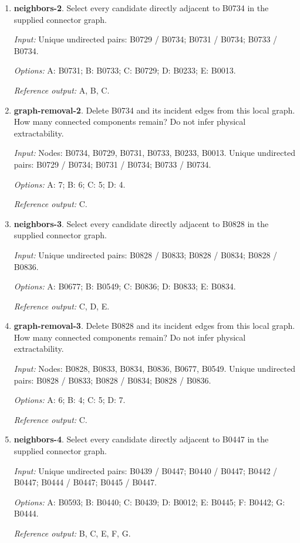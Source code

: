 \begin{enumerate}
\item \textbf{neighbors-2}. Select every candidate directly adjacent to B0734 in the supplied connector graph.\par {\small \textit{Input:} Unique undirected pairs: B0729 / B0734; B0731 / B0734; B0733 / B0734. \par\textit{Options:} A: B0731; B: B0733; C: B0729; D: B0233; E: B0013. \par\textit{Reference output:} A, B, C.}
\item \textbf{graph-removal-2}. Delete B0734 and its incident edges from this local graph. How many connected components remain? Do not infer physical extractability.\par {\small \textit{Input:} Nodes: B0734, B0729, B0731, B0733, B0233, B0013. Unique undirected pairs: B0729 / B0734; B0731 / B0734; B0733 / B0734. \par\textit{Options:} A: 7; B: 6; C: 5; D: 4. \par\textit{Reference output:} C.}
\item \textbf{neighbors-3}. Select every candidate directly adjacent to B0828 in the supplied connector graph.\par {\small \textit{Input:} Unique undirected pairs: B0828 / B0833; B0828 / B0834; B0828 / B0836. \par\textit{Options:} A: B0677; B: B0549; C: B0836; D: B0833; E: B0834. \par\textit{Reference output:} C, D, E.}
\item \textbf{graph-removal-3}. Delete B0828 and its incident edges from this local graph. How many connected components remain? Do not infer physical extractability.\par {\small \textit{Input:} Nodes: B0828, B0833, B0834, B0836, B0677, B0549. Unique undirected pairs: B0828 / B0833; B0828 / B0834; B0828 / B0836. \par\textit{Options:} A: 6; B: 4; C: 5; D: 7. \par\textit{Reference output:} C.}
\item \textbf{neighbors-4}. Select every candidate directly adjacent to B0447 in the supplied connector graph.\par {\small \textit{Input:} Unique undirected pairs: B0439 / B0447; B0440 / B0447; B0442 / B0447; B0444 / B0447; B0445 / B0447. \par\textit{Options:} A: B0593; B: B0440; C: B0439; D: B0012; E: B0445; F: B0442; G: B0444. \par\textit{Reference output:} B, C, E, F, G.}

\end{enumerate}
